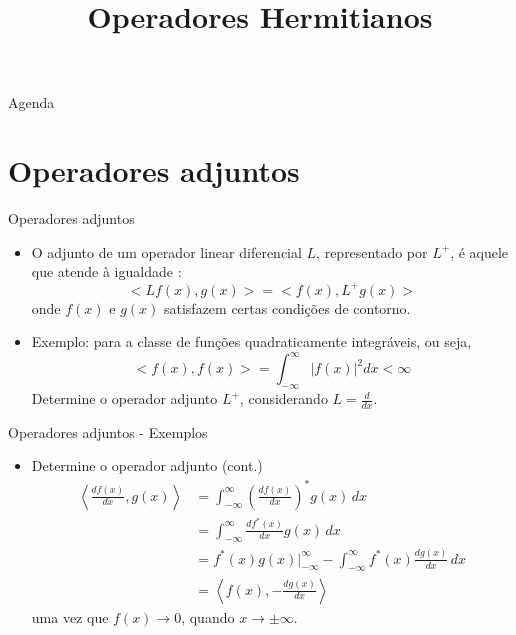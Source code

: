 


\title{\cursogrande\\ \vspace{1cm}Operadores Hermitianos}


   \maketitle[randomdots={false}]
   \begin{slide}{Agenda}
      \tableofcontents[content=sections]
   \end{slide}

   \section[ slide = true ]{Operadores adjuntos}
      \begin{slide}[toc=]{Operadores adjuntos}
		\begin{itemize}
			\item O adjunto de um operador linear diferencial $L$, representado por $L^+$, é aquele que atende à igualdade :
				\begin{equation*}
					<Lf(x),g(x)> = <f(x),L^+g(x)> 
				\end{equation*}
					onde $f(x)$ e $g(x)$ satisfazem certas condições de contorno.
			\item Exemplo: para a classe de funções quadraticamente integráveis, ou seja,
				\begin{equation*}
					<f(x),f(x)> = \int_{-\infty}^\infty |f(x)|^2 dx < \infty
				\end{equation*}
				Determine o operador adjunto $L^+$, considerando $L = \frac{d}{dx}$.
				
		\end{itemize}
      \end{slide}
      \begin{slide}[toc=]{Operadores adjuntos - Exemplos}
	      \begin{itemize}
		      \item Determine o operador adjunto (cont.)
			      \begin{align*}
					\left < \frac{df(x)}{dx},g(x)\right > &= \int_{-\infty}^\infty \left ( \frac{df(x)}{dx} \right )^\ast g(x)\,dx\\
					                                      &=\int_{-\infty}^\infty \frac{df^\ast(x)}{dx} g(x)\,dx\\
									      &= f^\ast(x)g(x)\Big \vert_{-\infty}^\infty - \int_{-\infty}^\infty f^\ast(x)\frac{dg(x)}{dx}\,dx\\
									      &= \left < f(x), -\frac{dg(x)}{dx} \right >
					\end{align*}
					uma vez que $f(x)\rightarrow 0$, quando $x\rightarrow \pm \infty$.
		\end{itemize}
      \end{slide}

